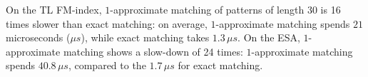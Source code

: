 On the TL FM-index, $1$-approximate matching of patterns of length 30 is 16 times slower than exact matching: on average, $1$-approximate matching spends $21$ microseconds ($\mu s$), while exact matching takes $1.3 \, \mu s$.
On the ESA, $1$-approximate matching shows a slow-down of 24 times: $1$-approximate matching spends $40.8 \, \mu s$, compared to the $1.7 \, \mu s$ for exact matching.

%
%
%
